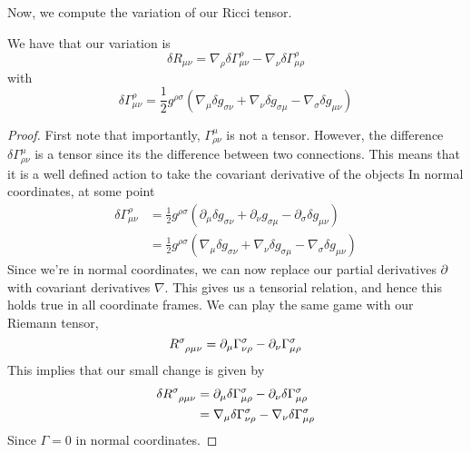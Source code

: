 Now, we compute the variation of our Ricci tensor. 
\begin{claim}
	We have that our variation is 
	\[
	 \delta R_{ \mu \nu } = \nabla _ \rho \delta \Gamma ^ \rho _{ \mu \nu } - \nabla_{ \nu  }
	 \delta \Gamma ^ \rho _{ \mu \rho }
	\]  with 
	\[
	 \delta \Gamma ^ \rho _{ \mu \nu } = \frac{1}{2 } 
	 g ^{ \rho \sigma } ( \nabla _ \mu \delta g _{ \sigma \nu } + 
	 \nabla _ \nu \delta g _{ \sigma \mu } - \nabla _ \sigma \delta g_{ \mu \nu } ) 
	\] 
\begin{proof}
	First note that importantly, $ \Gamma ^ \mu _{ \rho \nu } $ is not a tensor. 
	However, the difference $ \delta \Gamma ^ \mu _{ \rho \nu } $ 
	is a tensor since its the difference between two connections. This means that it is a well defined action 
	to take the covariant derivative of the objects
	In normal coordinates, at some point 
	\begin{align*}
		\delta \Gamma^ \rho _{ \mu \nu } &= \frac{1}{2 }  g ^{ \rho  \sigma }\left( 
		\partial  _ \mu \delta g _{ \sigma \nu } + \partial  _ \nu 
	g _{ \sigma \mu } - \partial  _ \sigma \delta g _{ \mu \nu } \right)   \\
						 &=  \frac{1}{2 } g ^{ \rho\sigma } \left(  
						 \nabla _ \mu \delta g _{ \sigma \nu } 
					 + \nabla _ \nu \delta g _{ \sigma \mu } 
				  - \nabla _{ \sigma } \delta g _{ \mu \nu }\right)  
	\end{align*}
	Since we're in normal coordinates, we can now replace our partial 
	derivatives $ \partial $ with covariant derivatives $ \nabla $. 
	This gives us a tensorial relation, and hence this 
	holds true in all coordinate frames. We can play the same 
	game with our Riemann tensor, 
	\[
	 R \indices{ ^ \sigma _{ \rho \mu \nu } }  = \partial  _ \mu \Gamma ^ \sigma _{ \nu \rho } 
	  - \partial  _ \nu \Gamma ^ \sigma _{ \mu \rho }
	\]  This implies that our small change 
	is given by 
	\begin{align*}
		\delta R \indices{ ^ \sigma _{ \rho \mu \nu } } &=  \partial  _ \mu  
		\delta \Gamma ^ \sigma _{ \mu \rho }  - \partial  _ \nu \delta \Gamma 
		^ \sigma _{ \mu \rho }\\
		&=  \nabla _ \mu \delta \Gamma ^ \sigma _{ \nu \rho } - 
		\nabla _ \nu \delta \Gamma ^ \sigma _{ \mu \rho } \\
	\end{align*} Since $ \Gamma  =0 $ in normal coordinates.  
\end{proof}
\end{claim}
